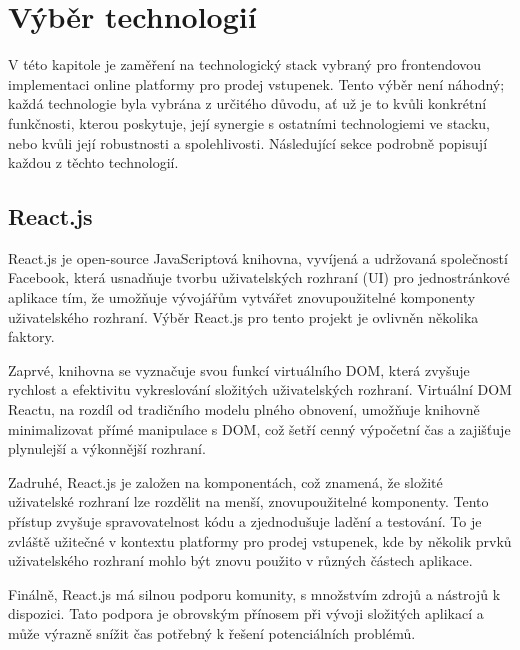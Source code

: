 \section{Výběr technologií}
\label{sec:implementace-techologie}
V této kapitole je zaměření na technologický stack vybraný pro frontendovou implementaci online platformy pro prodej vstupenek.
Tento výběr není náhodný; každá technologie byla vybrána z určitého důvodu, ať už je to kvůli konkrétní funkčnosti, kterou poskytuje, její synergie s ostatními technologiemi ve stacku, nebo kvůli její robustnosti a spolehlivosti.
Následující sekce podrobně popisují každou z těchto technologií.

\subsection{React.js}
\label{subsec:implementace-techologie-react}
React.js je open-source JavaScriptová knihovna, vyvíjená a udržovaná společností Facebook, která usnadňuje tvorbu uživatelských rozhraní (UI) pro jednostránkové aplikace tím, že umožňuje vývojářům vytvářet znovupoužitelné komponenty uživatelského rozhraní.
Výběr React.js pro tento projekt je ovlivněn několika faktory.

Zaprvé, knihovna se vyznačuje svou funkcí virtuálního DOM, která zvyšuje rychlost a efektivitu vykreslování složitých uživatelských rozhraní.
Virtuální DOM Reactu, na rozdíl od tradičního modelu plného obnovení, umožňuje knihovně minimalizovat přímé manipulace s DOM, což šetří cenný výpočetní čas a zajišťuje plynulejší a výkonnější rozhraní.

Zadruhé, React.js je založen na komponentách, což znamená, že složité uživatelské rozhraní lze rozdělit na menší, znovupoužitelné komponenty.
Tento přístup zvyšuje spravovatelnost kódu a zjednodušuje ladění a testování.
To je zvláště užitečné v kontextu platformy pro prodej vstupenek, kde by několik prvků uživatelského rozhraní mohlo být znovu použito v různých částech aplikace.

Finálně, React.js má silnou podporu komunity, s množstvím zdrojů a nástrojů k dispozici.
Tato podpora je obrovským přínosem při vývoji složitých aplikací a může výrazně snížit čas potřebný k řešení potenciálních problémů.

